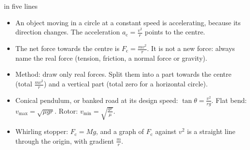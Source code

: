 \begin{summarybox}[unbreakable]{ in five lines}
\begin{itemize}
  \item An object moving in a circle at a constant speed is accelerating, because its
        direction changes. The acceleration $a_\mathrm{c} = \frac{v^2}{r}$ points to the centre.
  \item The net force towards the centre is $F_\mathrm{c} = \frac{mv^2}{r}$. It is not a new force:
        always name the real force (tension, friction, a normal force or gravity).
  \item Method: draw only real forces. Split them into a part towards the centre (total
        $\frac{mv^2}{r}$) and a vertical part (total zero for a horizontal circle).
  \item Conical pendulum, or banked road at its design speed: $\tan\theta = \frac{v^2}{rg}$. Flat bend:
        $v_\mathrm{max} = \sqrt{\mu g r}$. Rotor: $v_\mathrm{min} = \sqrt{\frac{gr}{\mu}}$.
  \item Whirling stopper: $F_\mathrm{c} = Mg$, and a graph of $F_\mathrm{c}$ against $v^2$ is a
        straight line through the origin, with gradient $\frac{m}{r}$.
\end{itemize}
\end{summarybox}
